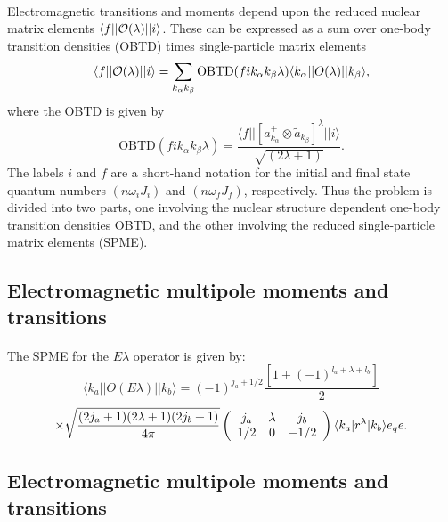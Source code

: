 \documentclass[%
twoside,                 %
final,                   %
10pt]{article}
\begin{document}
\paragraph{}
Electromagnetic transitions and moments depend upon the reduced nuclear
matrix elements $\langle f\vert\vert {\cal O}(\lambda )\vert\vert i\rangle$. These can be expressed as a sum over one-body transition
densities (OBTD) times single-particle matrix elements
\[
\langle f\vert\vert {\cal O}(\lambda )\vert\vert i\rangle
=\sum _{k_{\alpha } k_{\beta }}\mathrm{OBTD}(f i k_{\alpha } k_{\beta } \lambda )
 \langle k_{\alpha }\vert\vert O(\lambda )\vert\vert k_{\beta }\rangle, 
\]
where the OBTD is given by
\[
\mathrm{OBTD}(f i k_{\alpha} k_{\beta}\lambda)= \frac{\langle f\vert\vert [a^{+}_{k_{\alpha }}\otimes \tilde{a}_{k_{\beta }}]^{\lambda }\vert\vert i\rangle}{\sqrt{(2\lambda +1)}}. 
\]
The labels $i$ and $f$ are a short-hand notation for the initial
and final state quantum numbers $(n \omega _{i}J_{i})$ and $(n\omega_{f}J_{f})$,
respectively. Thus the problem is divided into two parts, one
involving the nuclear structure dependent one-body transition
densities OBTD, and the other involving the reduced
single-particle matrix
elements (SPME).





\subsection*{Electromagnetic multipole moments and transitions}

\paragraph{}
The SPME for the $  E\lambda   $ operator is given by:
\[
\langle k_{a}\vert\vert O(E\lambda )\vert\vert k_{b}\rangle=(-1)^{j_{a}+1/2}\frac{[1+(-1)^{l_{a}+\lambda +l_{b}}]}{2}
\]
\[
 \times\sqrt{ {(2j_{a}+1)(2\lambda +1)(2j_{b}+1)\over4\pi }}\left(\begin{array}{ccc}  {j_{a}}&  {\lambda} &  {j_{b}}\\  {1/2} & {0}&  {-1/2}\end{array}\right)\langle k_{a}\vert r^{\lambda }\vert k_{b}\rangle e_{q} e.
\]



\subsection*{Electromagnetic multipole moments and transitions}
\end{document}
